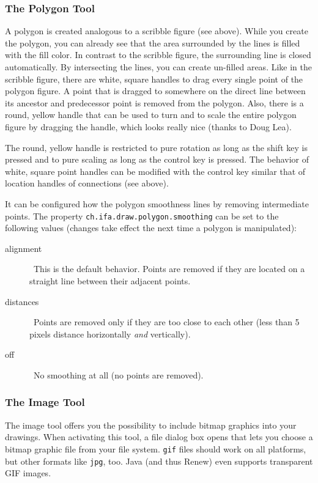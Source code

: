 \subsubsection{The Polygon Tool}

A polygon is created analogous to a scribble figure (see above).
While you create the polygon, you can already see that the area
surrounded by the lines is filled with the fill color.
In contrast to the scribble figure, the surrounding line is closed
automatically. By intersecting the lines, you can create un-filled
areas. Like in the scribble figure, there are white, square handles
to drag every single point of the polygon figure. A point that is 
dragged to somewhere on the direct line between
its ancestor and predecessor point is removed from the polygon.
Also, there is a round, yellow handle that can be used to
turn and to scale the entire polygon figure by dragging the handle,
which looks really nice (thanks to Doug Lea).

The round, yellow handle is restricted to pure rotation
as long as the shift key is pressed and to pure scaling as long as the
control key is pressed.
The behavior of white, square point handles can be modified with the
control key similar that of location handles of connections (see above).

It can be configured how the polygon smoothness lines by removing
intermediate points.
The property \texttt{ch.ifa.draw.polygon.smoothing} can be set to the
following values (changes take effect the next time a polygon is
manipulated):
\begin{description}
  \item[alignment]
    \ This is the default behavior.
    Points are removed if they are located on a straight line between their
    adjacent points.
  \item[distances]
    \ Points are removed only if they are too close to each
    other (less than 5 pixels distance horizontally \emph{and}
    vertically).
  \item[off]
    \ No smoothing at all (no points are removed).
\end{description}


\subsubsection{The Image Tool}

The image tool offers you the possibility to include bitmap graphics into your
drawings. When activating this tool, a file dialog box opens that lets you
choose a bitmap graphic file from your file system.
\texttt{gif} files should work on all platforms, but other formats like
\texttt{jpg}, too.
Java (and thus Renew) even supports transparent GIF images.

